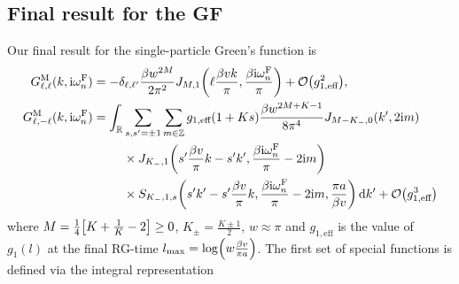 \documentclass[english, parskip=full]{scrartcl}
\begin{document}
\subsection{Final result for the GF}
Our final result for the single-particle Green's function is %
\begin{align} 
G_{\ell,\ell}^\M(k,\i\omega_n^\F) &= -\delta_{\ell,\ell'} \frac{\beta w^{2M}}{2\pi^2} J_{M,1}\kla*{\ell \frac{\beta vk}{\pi}, \frac{\beta\i\omega_n^\F}{\pi}} + \mathcal{O}\kla*{g_{1,\text{eff}}^2},\\
G_{\ell,-\ell}^\M(k,\i\omega_n^\F) &= \bsplit{\int_\mathbb{R} &\sum_{s,s'=\pm 1} \sum_{m\in\mathbb{Z}} g_{1,\text{eff}} (1+Ks) \frac{\beta  w^{2M+K-1}}{8\pi^4} J_{M-K_-,0}\kla*{k',2\i m} \\
&\times J_{K_-,1} \kla*{s' \frac{\beta v}{\pi}k-s' k',\frac{\beta\i\omega_n^\F}{\pi} - 2\i m} \\
&\times S_{K_-,1,s}\kla*{s' k' - s' \frac{\beta v}{\pi} k,\frac{\beta\i\omega_n^\F}{\pi} - 2\i m, \frac{\pi a}{\beta v}}\,\d k' + \mathcal{O}\kla*{g_{1,\text{eff}}^3} }
\end{align}
where $M=\frac{1}{4}\klb*{K+\frac{1}{K}-2}\ge 0$, $K_\pm = \frac{K\pm 1}{2}$, $w\approx\pi$ and $g_{1,\text{eff}}$ is the value of $g_1(l)$ at the final RG-time $l_\text{max} = \log\kla*{w\frac{\beta v}{\pi a}}$.
The first set of special functions is defined via the integral representation%
\end{document}

